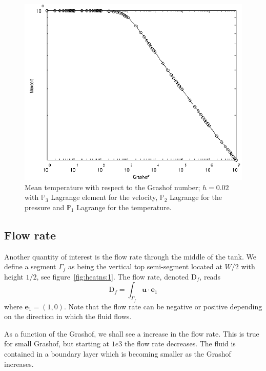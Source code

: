 \begin{figure}[htbp]
  \centering
  \includegraphics[width=.8\linewidth]{pngs/temp_grashof}
  \caption{Mean temperature with respect to the Grashof number;
    $h=0.02$ with $\mathbb{P}_3$ Lagrange element for the velocity,
    $\mathbb{P}_2$ Lagrange for the pressure and $\mathbb{P}_1$
    Lagrange for the temperature.}
  \label{fig:heatns:3}
\end{figure}

\subsection{Flow rate}
\label{sec:flow-rate}

Another quantity of interest is the flow rate through the middle of the
tank. We define a segment $\Gamma_f$ as being the vertical top
semi-segment located at $W/2$ with height $1/2$, see
figure~\ref{fig:heatns:1}. The flow rate, denoted $\mathrm{D}_f$, reads
\begin{equation}
  \label{eq:17}
  \mathrm{D}_f =  \int_{\Gamma_f} \mathbf{u} \cdot \mathbf{e}_1
\end{equation}
where $\mathbf{e}_1=(1,0)$. Note that the flow rate can be negative or
positive depending on the direction in which the fluid flows.

As a function of the Grashof, we shall see a increase in the flow
rate. This is true for small Grashof, but starting at $1e3$ the flow
rate decreases. The fluid is contained in a boundary layer which is
becoming smaller as the Grashof increases.

